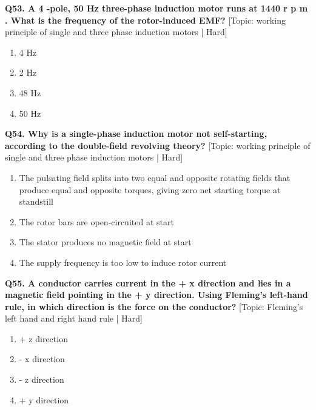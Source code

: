 \noindent\textbf{Q53. A 4 -pole, 50 Hz three-phase induction motor runs at 1440 r p m . What is the frequency of the rotor-induced EMF?} \hfill [Topic: working principle of single and three phase induction motors | Hard]
\begin{enumerate}[label=(\alph*),topsep=2pt,itemsep=1pt,partopsep=0pt,parsep=0pt]
    \item {4 Hz}
    \item {2 Hz}
    \item {48 Hz}
    \item {50 Hz}
\end{enumerate}
\vspace{2mm}

\noindent\textbf{Q54. Why is a single-phase induction motor not self-starting, according to the double-field revolving theory?} \hfill [Topic: working principle of single and three phase induction motors | Hard]
\begin{enumerate}[label=(\alph*),topsep=2pt,itemsep=1pt,partopsep=0pt,parsep=0pt]
    \item {The pulsating field splits into two equal and opposite rotating fields that produce equal and opposite torques, giving zero net starting torque at standstill}
    \item {The rotor bars are open-circuited at start}
    \item {The stator produces no magnetic field at start}
    \item {The supply frequency is too low to induce rotor current}
\end{enumerate}
\vspace{2mm}

\noindent\textbf{Q55. A conductor carries current in the + x direction and lies in a magnetic field pointing in the + y direction. Using Fleming's left-hand rule, in which direction is the force on the conductor?} \hfill [Topic: Fleming's left hand and right hand rule | Hard]
\begin{enumerate}[label=(\alph*),topsep=2pt,itemsep=1pt,partopsep=0pt,parsep=0pt]
    \item {+ z direction}
    \item {- x direction}
    \item {- z direction}
    \item {+ y direction}
\end{enumerate}
\vspace{2mm}

